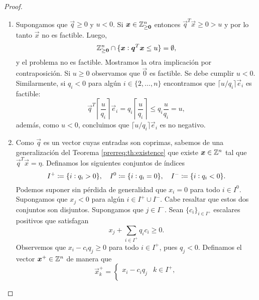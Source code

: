 \begin{proof} \hfill
	\begin{enumerate}
		\item Supongamos que $\vec{q} \geq 0$ y $u < 0$. Si $\boldsymbol{x} \in \mathbb{Z}_{\geq \boldsymbol{0}}^n$
			entonces $\vec{q}^T\vec{x} \geq 0 > u$ y por lo tanto $\vec{x}$ no es factible. Luego,
			\begin{equation}
				\label{infeasibility}
				\mathbb{Z}_{\geq \boldsymbol{0}}^{n} \cap \lbrace \boldsymbol{x} \vcentcolon \boldsymbol{q}^T\boldsymbol{x} 
				\leq u \rbrace = \emptyset,
			\end{equation}
			y el problema no es factible. Mostramos la otra implicación por contraposición. Si $u
			\geq 0$ observamos que $\vec{0}$ es factible. Se debe cumplir $u < 0$. Similarmente, si
			$q_i < 0$ para algún $i \in \lbrace 2, \ldots, n \rbrace$ encontramos que $\lceil u/q_i
			\rceil\vec{e}_i$ es factible:
			\begin{equation}
				\vec{q}^T\left\lceil \frac{u}{q_i} \right\rceil\vec{e}_i
				= q_i \left\lceil \frac{u}{q_i} \right\rceil
				\leq q_i \frac{u}{q_i} = u,
			\end{equation}
			además, como $u < 0$, concluimos que $\lceil u/q_i \rceil\vec{e}_i$ es no negativo.
		\item Como $\vec{q}$ es un vector cuyas entradas son coprimas, sabemos de una generalización
			del Teorema \ref{prerreq:th:existence} que existe $\boldsymbol{x} \in \mathbb{Z}^n$ tal que
			$\vec{q}^T\vec{x} = \eta$. Definamos los siguientes conjuntos de índices
			\begin{equation}
				I^+ \coloneq \lbrace i \vcentcolon q_i > 0 \rbrace,
				\quad I^0 \coloneq \lbrace i \vcentcolon q_i = 0 \rbrace,
				\quad I^- \coloneq \lbrace i \vcentcolon q_i < 0 \rbrace.
			\end{equation}
			Podemos suponer sin pérdida de generalidad que $x_i = 0$ para todo $i \in I^0$.
			Supongamos que $x_j < 0$ para algún $i \in I^+ \cup I^-$. Cabe resaltar que estos dos
			conjuntos son disjuntos. Supongamos que $j \in I^-$. Sean $\lbrace c_i \rbrace_{i \in
			I^+}$ escalares positivos que satisfagan
			\begin{equation}
				\label{proof:non-negativity}
				x_j + \sum_{i \in I^+}q_ic_i \geq 0.
			\end{equation}
			Observemos que $x_i - c_iq_j \geq 0$ para todo $i \in I^+$, pues $q_j < 0$. Definamos el
			vector $\boldsymbol{x}^+ \in \mathbb{Z}^n$ de manera que
			\begin{equation}
				\vec{x}^+_k = \begin{cases}
					x_i - c_iq_j & k \in I^+, \\

\end{cases}
\end{equation}
\end{enumerate}
\end{proof}
